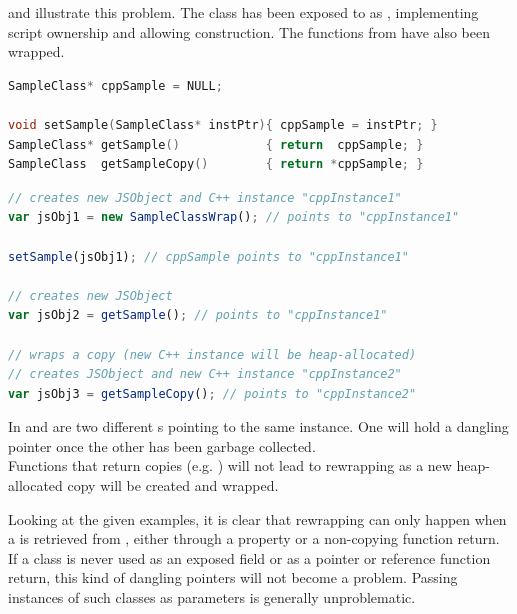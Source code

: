 and  illustrate this problem. The class  has been exposed to  as , implementing script ownership and allowing construction. The functions from  have also been wrapped.

\SingleSpacing
\begin{lstlisting}[language=C++, caption=Example for dangling pointers (\myProperName{C++}), label=lst:DanglingCPP]
SampleClass* cppSample = NULL;

void setSample(SampleClass* instPtr){ cppSample = instPtr; }
SampleClass* getSample()            { return  cppSample; }
SampleClass  getSampleCopy()        { return *cppSample; }
\end{lstlisting}
\OnehalfSpacing

\SingleSpacing
\begin{lstlisting}[language=JavaScript, caption=Example for dangling pointers (\myProperName{JavaScript}), label=lst:DanglingJS]
// creates new JSObject and C++ instance "cppInstance1"
var jsObj1 = new SampleClassWrap(); // points to "cppInstance1"

setSample(jsObj1); // cppSample points to "cppInstance1"

// creates new JSObject
var jsObj2 = getSample(); // points to "cppInstance1"

// wraps a copy (new C++ instance will be heap-allocated)
// creates JSObject and new C++ instance "cppInstance2"
var jsObj3 = getSampleCopy(); // points to "cppInstance2"
\end{lstlisting}
\OnehalfSpacing

In   and  are two different s pointing to the same  instance. One will hold a dangling pointer once the other has been garbage collected.\\
Functions that return copies (e.g. ) will not lead to rewrapping as a new heap-allocated copy will be created and wrapped.

Looking at the given examples, it is clear that rewrapping can only happen when a  is retrieved from , either through a property or  a non-copying function return. If a class is never used as an exposed field or as a pointer or reference function return, this kind of dangling pointers will not become a problem. Passing instances of such classes as parameters is generally unproblematic.

